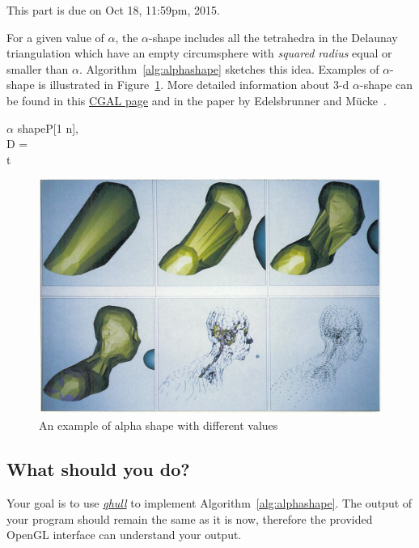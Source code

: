\documentclass[11pt]{article}
\begin{document}
This part is due on Oct 18, 11:59pm, 2015.

For a given value of $\alpha$, 
the $\alpha$-shape includes all the tetrahedra in the Delaunay triangulation which have an empty circumsphere with {\em squared radius} equal or smaller than $\alpha$.
Algorithm~\ref{alg:alphashape} sketches this idea. Examples of $\alpha$-shape is illustrated in Figure~\ref{alg:alpha}.
More detailed information about 3-d  $\alpha$-shape can be found in this 
\href{http://www.cgal.org/Manual/latest/doc_html/cgal_manual/Alpha_shapes_3/Chapter_main.html}{CGAL page} and in
the paper by Edelsbrunner and M\"{u}cke~\cite{em-tdas-94}.

{\small
	\begin{pseudocode}[shadowbox]{$\alpha$ shape}{P[1 \cdots n], \alpha}
	\label{alg:alphashape}
	\\
	D =  \\
	 \DO
	\BEGIN
	\IF {}  \DO
		 t
	\END
	\end{pseudocode}
}


\begin{figure}[h]
\centering
\includegraphics[width=.5\textwidth]{FIGS/alphashape}
\caption{An example of alpha shape with different values}
\label{alg:alpha}
\end{figure}




\subsection{What should  you do?}

Your goal is to use \href{http://www.qhull.org/}{\it qhull} to implement Algorithm~\ref{alg:alphashape}.
The output of your program should remain the same as it is now, therefore
the provided OpenGL interface can understand your output.
\end{document}
